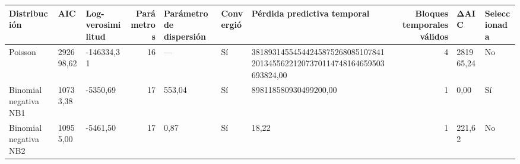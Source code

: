 \begin{tabular}{lllrlllrll}
\toprule
Distribución & AIC & Log-verosimilitud & Parámetros & Parámetro de dispersión & Convergió & Pérdida predictiva temporal & Bloques temporales válidos & ΔAIC & Seleccionada \\
\midrule
Poisson & 292698,62 & -146334,31 & 16 & — & Sí & 3818931455454424587526808510784120134556221207370114748164659503693824,00 & 4 & 281965,24 & No \\
Binomial negativa NB1 & 10733,38 & -5350,69 & 17 & 553,04 & Sí & 898118580930499200,00 & 1 & 0,00 & Sí \\
Binomial negativa NB2 & 10955,00 & -5461,50 & 17 & 0,87 & Sí & 18,22 & 1 & 221,62 & No \\
\bottomrule
\end{tabular}
